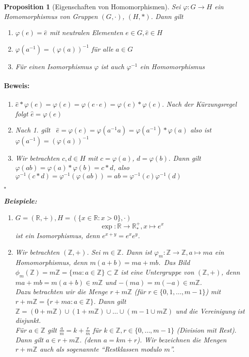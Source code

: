 \documentclass{report}
\newcommand{\R}{\mathbb{R}}
\newcommand{\Z}{\mathbb{Z}}
\theoremstyle{customrem}
\theoremstyle{customdef}
\newtheorem{proposition}[definition]{Proposition}
\renewenvironment{proof}{\vspace{-.75cm}\paragraph{Beweis: }}{\vspace{-.5cm}\hfill$\square$}
\begin{document}
	\begin{proposition}[Eigenschaften von Homomorphismen]
		Sei $\varphi : G \to H$ ein Homomorphismus von Gruppen $(G, \cdot)$, $(H, \ast)$. Dann gilt
		\begin{enumerate}
			\itemsep0cm
			\item $\varphi(e) = \hat{e}$ mit neutralen Elementen $e \in G, \hat{e} \in H$
			\item $\varphi(a^{-1}) = (\varphi(a))^{-1}$ für alle $a \in G$
			\item Für einen Isomorphismus $\varphi$ ist auch $\varphi^{-1}$ ein Homomorphismus
		\end{enumerate}
		\begin{proof}
			\begin{enumerate}
				\item $\hat{e} * \varphi(e) = \varphi(e) = \varphi(e \cdot e) = \varphi(e) * \varphi(e)$. Nach der Kürzungsregel folgt $\hat{e} = \varphi(e)$
				\item Nach 1. gilt \ $\hat{e} = \varphi(e) = \varphi(a^{-1} a) = \varphi(a^{-1}) * \varphi(a)$ also ist $\varphi(a^{-1}) = (\varphi(a))^{-1}$				
				\item Wir betrachten $c, d \in H$ mit $c = \varphi(a)$, $d = \varphi(b)$. Dann gilt $\varphi(a b) = \varphi(a) * \varphi(b) = c * d$, also $\varphi^{-1}(c * d) = \varphi^{-1}(\varphi(a b)) = ab = \varphi^{-1}(c) \varphi^{-1}(d)$
			\end{enumerate}	
		\end{proof}
		
		\textbf{Beispiele:}
		\begin{enumerate}
			\item $G = (\R, +), H = (\{x \in \R : x > 0\}, \cdot)$
				$$\exp : \R \to \R^+_*, x \mapsto e^x$$
				ist ein Isomorphismus, denn $e^{x + y} = e^x e^y$.
			\item Wir betrachten $(\Z, +)$. Sei $m \in \Z$. Dann ist $\varphi_m : \Z \to \Z, a \mapsto ma$ ein Homomorphismus, denn $m(a + b) = ma + mb$.\ Das Bild $\phi_m(\Z) = m\Z = \{m a : a \in \Z\} \subset \Z$  ist eine Untergruppe von $(\Z, +)$, denn $ma + mb = m(a + b) \in m\Z$ und $-(ma) = m(-a) \in m\Z$.\\	
			
			Dazu betrachten wir die Menge $r + m\Z$ (für $r \in \{0, 1, \dots, m-1\}$) mit $r + m\Z = \{r+ma : a \in \Z\}$. Dann gilt $\Z = (0 +m\Z) \cup (1 + m\Z) \cup \dots \cup(m-1 \cup m\Z)$ und die Vereinigung ist disjunkt.\\	Für $a \in \Z$ gilt $\frac{a}{m} = k + \frac{r}{m}$ für $k \in \Z, r \in \{0, \dots, m-1\}$ (Division mit Rest). Dann gilt $ a \in r + m\Z$. (denn $a = km + r$). Wir bezeichnen die Mengen $r + m\Z$ auch als sogenannte "`\textit{Restklassen modulo $m$}"'.\\
			

\end{enumerate}
\end{proposition}
\end{document}
